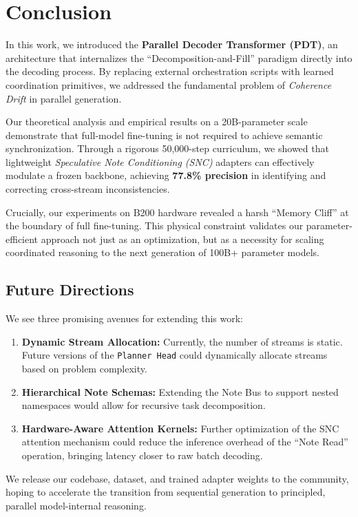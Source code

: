 \section{Conclusion}
\label{sec:conclusion}

In this work, we introduced the \textbf{Parallel Decoder Transformer (PDT)}, an architecture that internalizes the ``Decomposition-and-Fill'' paradigm directly into the decoding process. By replacing external orchestration scripts with learned coordination primitives, we addressed the fundamental problem of \textit{Coherence Drift} in parallel generation.

Our theoretical analysis and empirical results on a 20B-parameter scale demonstrate that full-model fine-tuning is not required to achieve semantic synchronization. Through a rigorous 50,000-step curriculum, we showed that lightweight \textit{Speculative Note Conditioning (SNC)} adapters can effectively modulate a frozen backbone, achieving \textbf{77.8\% precision} in identifying and correcting cross-stream inconsistencies.

Crucially, our experiments on B200 hardware revealed a harsh ``Memory Cliff'' at the boundary of full fine-tuning. This physical constraint validates our parameter-efficient approach not just as an optimization, but as a necessity for scaling coordinated reasoning to the next generation of 100B+ parameter models.

\subsection{Future Directions}
We see three promising avenues for extending this work:
\begin{enumerate}
    \item \textbf{Dynamic Stream Allocation:} Currently, the number of streams is static. Future versions of the \texttt{Planner Head} could dynamically allocate streams based on problem complexity.
    \item \textbf{Hierarchical Note Schemas:} Extending the Note Bus to support nested namespaces would allow for recursive task decomposition.
    \item \textbf{Hardware-Aware Attention Kernels:} Further optimization of the SNC attention mechanism could reduce the inference overhead of the ``Note Read'' operation, bringing latency closer to raw batch decoding.
\end{enumerate}

We release our codebase, dataset, and trained adapter weights to the community, hoping to accelerate the transition from sequential generation to principled, parallel model-internal reasoning.